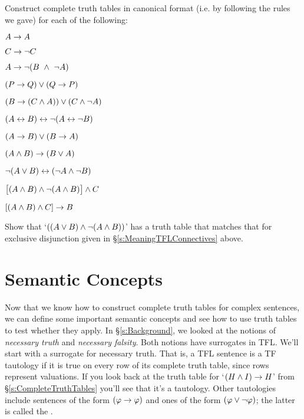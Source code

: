 \practiceproblems
\problempart
Construct complete truth tables in canonical format (i.e. by following the rules we gave) for each of the following:
\begin{earg}
\item $A \rightarrow A$ %
\item $C \rightarrow\neg C$ %
\item $A \rightarrow \neg (B \ \wedge  \ \neg A)$
\item $(P \rightarrow Q) \vee (Q \rightarrow P)$
\item $(B \rightarrow (C \wedge  A)) \vee (C \wedge  \neg A)$
\item $(A \leftrightarrow B) \leftrightarrow \neg(A\leftrightarrow \neg B)$ %
\item $(A \rightarrow B) \vee (B \rightarrow A)$ %
\item $(A \wedge B) \rightarrow (B \vee A)$  %
\item $\neg(A \vee B) \leftrightarrow (\neg A \wedge \neg B)$ %
\item $\bigl[(A\wedge B) \wedge\neg(A\wedge B)\bigr] \wedge C$ %
\item $[(A \wedge B) \wedge C] \rightarrow B$ %
\end{earg}

\problempart
Show that `$((A \vee B) \wedge \neg(A \wedge B))$' has a truth table that matches that for exclusive disjunction given in \S\ref{s:MeaningTFLConnectives} above.\\



\section{Semantic Concepts}\label{s:semanticconcepts}

Now that we know how to construct complete truth tables for complex sentences, we can define some important semantic concepts and see how to use truth tables to test whether they apply.  In \S\ref{s:Background}, we looked at the notions of \emph{necessary truth} and \emph{necessary falsity}. Both notions have surrogates in TFL. We'll start with a surrogate for necessary truth.
That is, a TFL sentence is a TF tautology if it is true on every row of its complete truth table, since rows represent valuations.  If you look back at the truth table for `$(H \wedge I) \rightarrow H$' from \S\ref{s:CompleteTruthTables} you'll see that it's a tautology.  Other tautologies include sentences of the form $(\mathcal{\varphi} \rightarrow \mathcal{\varphi})$ and ones of the form $(\mathcal{\varphi} \vee \neg \mathcal{\varphi})$; the latter is called the .

